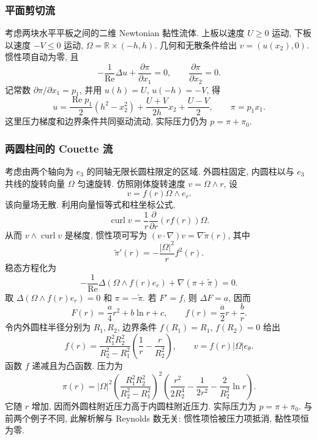\subsubsection{平面剪切流}
\label{subsec:chap1-planar-shear}

考虑两块水平平板之间的二维 Newtonian 黏性流体. 上板以速度 $U\geq0$ 运动, 下板以速度 $-V\leq0$ 运动, $\Omega=\mathbb{R}\times(-h,h)$. 几何和无散条件给出 $v=(u(x_2),0)$. 惯性项自动为零, 且
\[
  -\frac1{\operatorname{Re}}\Delta u+\frac{\partial\pi}{\partial x_1}=0,
  \qquad\frac{\partial\pi}{\partial x_2}=0.
\]
记常数 $\partial\pi/\partial x_1=p_1$, 并用 $u(h)=U$, $u(-h)=-V$, 得
\[
u=\frac{\operatorname{Re}p_1}{2}(h^2-x_2^2)+\frac{U+V}{2h}x_2+\frac{U-V}{2},
\qquad \pi=p_1x_1.
\]
这里压力梯度和边界条件共同驱动流动, 实际压力仍为 $p=\pi+\pi_0$.

\subsubsection{两圆柱间的 Couette 流}
\label{subsec:chap1-couette-flow}

考虑由两个轴向为 $e_3$ 的同轴无限长圆柱限定的区域. 外圆柱固定, 内圆柱以与 $e_3$ 共线的旋转向量 $\Omega$ 匀速旋转. 仿照刚体旋转速度 $v=\Omega\wedge r$, 设
\[
  v=f(r)\Omega\wedge e_r.
\]
该向量场无散. 利用向量恒等式和柱坐标公式,
\begin{equation}
\label{eq:chap1-couette-curl}
  \operatorname{curl}v=\frac1r\frac{\partial}{\partial r}(rf(r))\Omega.
\end{equation}
从而 $v\wedge\operatorname{curl}v$ 是梯度, 惯性项可写为 $(v\cdot\nabla)v=\nabla\widetilde\pi(r)$, 其中
\[
  \widetilde\pi'(r)=-\frac{|\Omega|^2}{r}f^2(r).
\]
稳态方程化为
\[
  -\frac1{\operatorname{Re}}\Delta(\Omega\wedge f(r)e_r)+\nabla(\pi+\widetilde\pi)=0.
\]
取 $\Delta(\Omega\wedge f(r)e_r)=0$ 和 $\pi=-\widetilde\pi$. 若 $F'=f$, 则 $\Delta F=a$, 因而
\[
  F(r)=\frac a4r^2+b\ln r+c,\qquad f(r)=\frac a2r+\frac br.
\]
令内外圆柱半径分别为 $R_1,R_2$, 边界条件 $f(R_1)=R_1$, $f(R_2)=0$ 给出
\[
  f(r)=\frac{R_1^2R_2^2}{R_2^2-R_1^2}\left(\frac1r-\frac r{R_2^2}\right),
  \qquad v=f(r)|\Omega|e_\theta.
\]
函数 $f$ 递减且为凸函数. 压力为
\[
\pi(r)=|\Omega|^2\left(\frac{R_1^2R_2^2}{R_2^2-R_1^2}\right)^2
\left(\frac{r^2}{2R_2^4}-\frac1{2r^2}-\frac2{R_2^2}\ln r\right).
\]
它随 $r$ 增加, 因而外圆柱附近压力高于内圆柱附近压力. 实际压力为 $p=\pi+\pi_0$. 与前两个例子不同, 此解析解与 Reynolds 数无关: 惯性项恰被压力项抵消, 黏性项恒为零.
